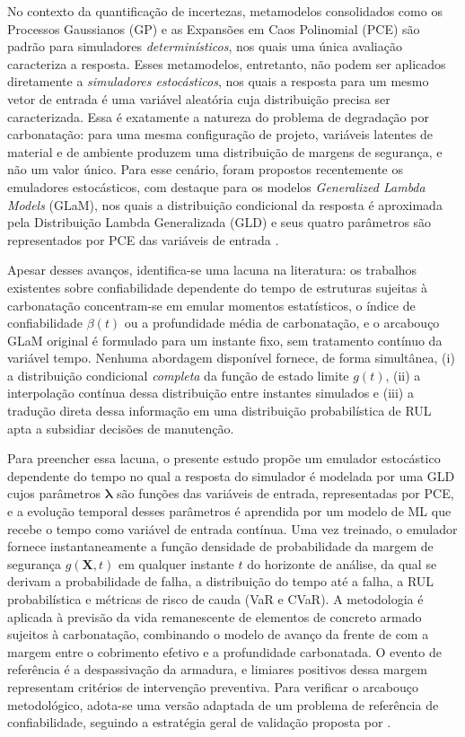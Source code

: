No contexto da quantificação de incertezas, metamodelos consolidados como os Processos Gaussianos (GP) \parencite{rasmussen2006} e as Expansões em Caos Polinomial (PCE) \parencite{xiu2002, blatman2011} são padrão para simuladores \textit{determinísticos}, nos quais uma única avaliação caracteriza a resposta. Esses metamodelos, entretanto, não podem ser aplicados diretamente a \textit{simuladores estocásticos}, nos quais a resposta para um mesmo vetor de entrada é uma variável aleatória cuja distribuição precisa ser caracterizada. Essa é exatamente a natureza do problema de degradação por carbonatação: para uma mesma configuração de projeto, variáveis latentes de material e de ambiente produzem uma distribuição de margens de segurança, e não um valor único. Para esse cenário, foram propostos recentemente os emuladores estocásticos, com destaque para os modelos \textit{Generalized Lambda Models} (GLaM), nos quais a distribuição condicional da resposta é aproximada pela Distribuição Lambda Generalizada (GLD) e seus quatro parâmetros são representados por PCE das variáveis de entrada \parencite{ZhuSudret2020, ZhuSudret2021}.

Apesar desses avanços, identifica-se uma lacuna na literatura: os trabalhos existentes sobre confiabilidade dependente do tempo de estruturas sujeitas à carbonatação concentram-se em emular momentos estatísticos, o índice de confiabilidade $\beta(t)$ ou a profundidade média de carbonatação, e o arcabouço GLaM original é formulado para um instante fixo, sem tratamento contínuo da variável tempo. Nenhuma abordagem disponível fornece, de forma simultânea, (i) a distribuição condicional \textit{completa} da função de estado limite $g(t)$, (ii) a interpolação contínua dessa distribuição entre instantes simulados e (iii) a tradução direta dessa informação em uma distribuição probabilística de RUL apta a subsidiar decisões de manutenção.

Para preencher essa lacuna, o presente estudo propõe um emulador estocástico dependente do tempo no qual a resposta do simulador é modelada por uma GLD cujos parâmetros $\boldsymbol{\lambda}$ são funções das variáveis de entrada, representadas por PCE, e a evolução temporal desses parâmetros é aprendida por um modelo de ML que recebe o tempo como variável de entrada contínua. Uma vez treinado, o emulador fornece instantaneamente a função densidade de probabilidade da margem de segurança $g(\mathbf{X}, t)$ em qualquer instante $t$ do horizonte de análise, da qual se derivam a probabilidade de falha, a distribuição do tempo até a falha, a RUL probabilística e métricas de risco de cauda (VaR e CVaR). A metodologia é aplicada à previsão da vida remanescente de elementos de concreto armado sujeitos à carbonatação, combinando o modelo de avanço da frente de \textcite{possan2010, possan2016co2} com a margem entre o cobrimento efetivo e a profundidade carbonatada. O evento de referência é a despassivação da armadura, e limiares positivos dessa margem representam critérios de intervenção preventiva. Para verificar o arcabouço metodológico, adota-se uma versão adaptada de um problema de referência de confiabilidade, seguindo a estratégia geral de validação proposta por \textcite{pires2024}.

